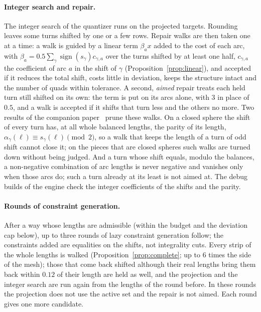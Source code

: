 \documentclass[11pt,a4paper]{article}
\newcommand{\shift}{s}
\begin{document}
\paragraph{Integer search and repair.}
The integer search of the quantizer runs on the projected targets. Rounding
leaves some turns shifted by one or a few rows. Repair walks are then taken
one at a time: a walk is guided by a linear term $\beta_a x$ added to the cost
of each arc, with $\beta_a = 0.5 \sum_\gamma \operatorname{sign}(\shift_\gamma)
c_{\gamma, a}$ over the turns shifted by at least one half, $c_{\gamma, a}$
the coefficient of arc $a$ in the shift of $\gamma$
(Proposition~\ref{prop:linear}), and accepted if it reduces the total shift, costs little in
deviation, keeps the structure intact and the number of quads within
tolerance. A second, \emph{aimed} repair treats each held turn still shifted
on its own: the term is put on its arcs alone, with $3$ in place of $0.5$, and a walk is accepted if it
shifts that turn less and the others no more. Two results of the companion
paper~\cite{gardent2026turns} prune these walks. On a closed sphere the shift
of every turn has, at all whole balanced lengths, the parity of its length,
$\alpha_\gamma(\ell) \equiv \shift_\gamma(\ell) \pmod 2$, so a walk that
keeps the length of a turn of odd shift cannot close it; on the pieces that
are closed spheres such walks are turned down without being judged. And a
turn whose shift equals, modulo the balances, a non-negative combination of
arc lengths is never negative and vanishes only when those arcs do; such a
turn already at its least is not aimed at. The debug builds of the engine
check the integer coefficients of the shifts and the parity.

\paragraph{Rounds of constraint generation.}
After a way whose lengths are admissible (within the budget and the
deviation cap below), up to three rounds of lazy constraint generation
follow; the constraints added are equalities on the shifts, not
integrality cuts. Every strip of the whole lengths is walked
(Proposition~\ref{prop:complete}; up to $6$ times the side of the mesh);
those that come back shifted although their real lengths bring them back
within $0.12$ of their length are held as well, and the projection and the
integer search are run again from the lengths of the round before. In these
rounds the projection does not use the active set and the repair is not
aimed. Each round gives one more candidate.
\end{document}
